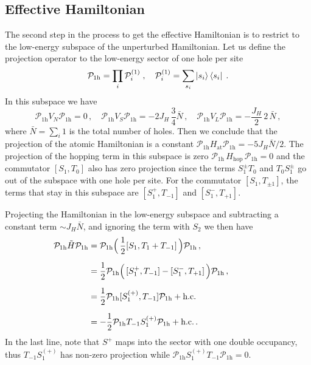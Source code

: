 \subsection{Effective Hamiltonian}
The second step in the process to get the effective Hamiltonian is to restrict to the low-energy subspace of the unperturbed Hamiltonian.
Let us define the projection operator to the low-energy sector of one hole per site
\begin{equation}
    \mathcal{P}_{1\mathrm{h}} =
    \prod_i \mathcal{P}_{i}^{(1)} \; , \quad  \mathcal{P}_{i}^{(1)} = \sum_{s_i} \ket{s_i}\bra{s_i}\; .
\end{equation}
In this subspace we have
\begin{equation}
    \mathcal{P}_{1\mathrm{h}} V_N \mathcal{P}_{1\mathrm{h}} = 0 \, , \quad
    \mathcal{P}_{1\mathrm{h}} V_S \mathcal{P}_{1\mathrm{h}} = - 2J_H \, \frac{3}{4} \bar{N}   \, , \quad
    \mathcal{P}_{1\mathrm{h}} V_L \mathcal{P}_{1\mathrm{h}} = -  \frac{J_H}{2} \, 2 \, \bar{N} \, ,
\end{equation}
where $\bar{N} = \sum_i 1$ is the total number of holes. Then we conclude that the projection of the atomic Hamiltonian is a constant %
$\mathcal{P}_{1\mathrm{h}} H_{\text{at}} \mathcal{P}_{1\mathrm{h}} = - 5J_H\bar{N} /2$.
The projection of the hopping term in this subspace is zero $\mathcal{P}_{1\mathrm{h}} \, H_{\text{hop}}\,\mathcal{P}_{1\mathrm{h}} = 0$ and the commutator $[S_1, T_0]$ also has zero projection since the terms $S_1^{\pm}T_0$ and $T_0S_1^{\pm}$ go out of the subspace with one hole per site. For the commutator $[S_1, T_{\pm 1}]$, the terms that stay in this subspace are  $[S_1^+, T_{- 1}]$ and  $[S_1^-, T_{+1}]$.


Projecting the Hamiltonian in the low-energy subspace and subtracting a constant term $\sim J_H\bar{N}$, and ignoring the term with $S_2$ we then have
\begin{align}\hspace*{-15mm}
    \mathcal{P}_{1\mathrm{h}} \tilde{H}  \mathcal{P}_{1\mathrm{h}}
&=
     \mathcal{P}_{1\mathrm{h}}  \Big(\, \frac{1}{2} [S_1, T_1 + T_{-1}] \, \Big)
     \mathcal{P}_{1\mathrm{h}} \, , \\[6pt]
     &=
    \frac{1}{2} \mathcal{P}_{1\mathrm{h}}  \Big( \,  [S_1^+, T_{- 1}] - [S_1^-, T_{+1}] \, \Big) \mathcal{P}_{1\mathrm{h}} \, , \\[6pt]
&=  \frac{1}{2}
     \mathcal{P}_{1\mathrm{h}}  [S_1^{(+)}, T_{-1}]  \mathcal{P}_{1\mathrm{h}} + \text{h.c.}\\[6pt]
     &=- \frac{1}{2}
     \mathcal{P}_{1\mathrm{h}} T_{-1} S_1^{(+)}  \mathcal{P}_{1\mathrm{h}} + \text{h.c.} \, .
\end{align}
In the last line, note that $S^+$ maps into the sector with one double occupancy, thus  $T_{-1} S_1^{(+)}$  has non-zero projection while $\mathcal{P}_{1\mathrm{h}}  S_1^{(+)} T_{-1}  \mathcal{P}_{1\mathrm{h}} =0$.




